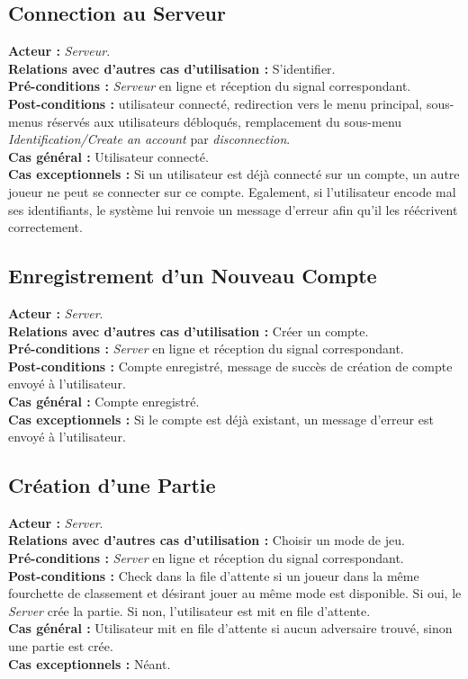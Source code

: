 \documentclass[10pt, a4paper]{article}
\begin{document}
\subsection{Connection au Serveur}
\textbf{Acteur :} \textit{Serveur}. \\
\textbf{Relations avec d'autres cas d'utilisation :} S'identifier. \\
\textbf{Pré-conditions :} \textit{Serveur} en ligne et réception du signal correspondant. \\
\textbf{Post-conditions :} utilisateur connecté, redirection vers le menu principal, sous-menus réservés aux utilisateurs débloqués, remplacement du sous-menu \textit{Identification/Create an account} par \textit{disconnection}. \\
\textbf{Cas général :} Utilisateur connecté. \\
\textbf{Cas exceptionnels :} Si un utilisateur est déjà connecté sur un compte, un autre joueur ne peut se connecter sur ce compte. Egalement, si l’utilisateur encode mal ses identifiants, le système lui renvoie un message d’erreur afin qu’il les réécrivent correctement. \\

\subsection{Enregistrement d'un Nouveau Compte}
\textbf{Acteur :} \textit{Server}. \\
\textbf{Relations avec d'autres cas d'utilisation :} Créer un compte. \\
\textbf{Pré-conditions :} \textit{Server} en ligne et réception du signal correspondant. \\
\textbf{Post-conditions :} Compte enregistré, message de succès de création de compte envoyé à l'utilisateur. \\
\textbf{Cas général :} Compte enregistré. \\
\textbf{Cas exceptionnels :} Si le compte est déjà existant, un message d'erreur est envoyé à l'utilisateur. \\

\subsection{Création d'une Partie}
\textbf{Acteur :} \textit{Server}. \\
\textbf{Relations avec d'autres cas d'utilisation :} Choisir un mode de jeu. \\
\textbf{Pré-conditions :} \textit{Server} en ligne et réception du signal correspondant. \\
\textbf{Post-conditions :} Check dans la file d'attente si un joueur dans la même fourchette de classement et désirant jouer au même mode est disponible. Si oui, le \textit{Server} crée la partie. Si non, l'utilisateur est mit en file d'attente. \\
\textbf{Cas général :} Utilisateur mit en file d'attente si aucun adversaire trouvé, sinon une partie est crée. \\
\textbf{Cas exceptionnels :} Néant. \\
\end{document}
